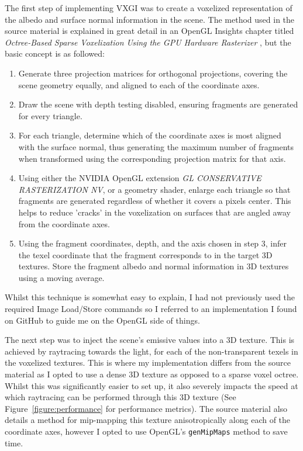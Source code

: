 \documentclass[]{acmsiggraph}
\begin{document}
The first step of implementing VXGI was to create a voxelized representation of the albedo and surface normal information in the scene. The method used in the source material \cite{crassinneyretsainzgreeneisemann2011} is explained in great detail in an OpenGL Insights chapter titled \textit{Octree-Based Sparse Voxelization Using the GPU Hardware Rasterizer} \cite{crassingreen2012}, but the basic concept is as followed:
\begin{enumerate}
	\item Generate three projection matrices for orthogonal projections, covering the scene geometry equally, and aligned to each of the coordinate axes.
	\item Draw the scene with depth testing disabled, ensuring fragments are generated for every triangle.
	\item For each triangle, determine which of the coordinate axes is most aligned with the surface normal, thus generating the maximum number of fragments when transformed using the corresponding projection matrix for that axis.
	\item Using either the NVIDIA OpenGL extension \textit{GL CONSERVATIVE RASTERIZATION NV}, or a geometry shader, enlarge each triangle so that fragments are generated regardless of whether it covers a pixels center. This helps to reduce 'cracks' in the voxelization on surfaces that are angled away from the coordinate axes.
	\item Using the fragment coordinates, depth, and the axis chosen in step 3, infer the texel coordinate that the fragment corresponds to in the target 3D textures. Store the fragment albedo and normal information in 3D textures using a moving average.
\end{enumerate}
Whilst this technique is somewhat easy to explain, I had not previously used the required Image Load/Store commands so I referred to an implementation I found on GitHub \cite{voxelization} to guide me on the OpenGL side of things.

The next step was to inject the scene's emissive values into a 3D texture. This is achieved by raytracing towards the light, for each of the non-transparent texels in the voxelized textures. This is where my implementation differs from the source material \cite{crassinneyretsainzgreeneisemann2011} as I opted to use a dense 3D texture as opposed to a sparse voxel octree. Whilst this was significantly easier to set up, it also severely impacts the speed at which raytracing can be performed through this 3D texture (See Figure~\ref{figure:performance} for performance metrics). The source material \cite{crassinneyretsainzgreeneisemann2011} also details a method for mip-mapping this texture anisotropically along each of the coordinate axes, however I opted to use OpenGL's \lstinline{genMipMaps} method to save time.
\end{document}
